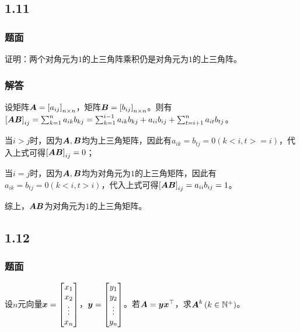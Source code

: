 \documentclass{beamer}
\begin{document}
\subsection*{1.11}

\begin{frame}
\frametitle{题面}

证明：两个对角元为\(1\)的上三角阵乘积仍是对角元为\(1\)的上三角阵。

\end{frame}

\begin{frame}
\frametitle{解答}

    设矩阵\(\boldsymbol{A}=\left[ a_{ij} \right]_{n\times n}\)，矩阵\(\boldsymbol{B}=\left[ b_{ij} \right]_{n\times n}\)。则有\(\left[ \boldsymbol{A}\boldsymbol{B} \right]_{ij}=\sum_{k=1}^na_{ik}b_{kj}=\sum_{k=1}^{i-1}a_{ik}b_{kj}+a_{ii}b_{ij}+\sum_{t=i+1}^na_{it}b_{tj}\)。

    当\(i>j\)时，因为\(\boldsymbol{A},\boldsymbol{B}\)均为上三角矩阵，因此有\(a_{ik}=b_{tj}=0(k<i,t>=i)\)，代入上式可得\(\left[ \boldsymbol{A}\boldsymbol{B} \right]_{ij}=0\)；

    当\(i=j\)时，因为\(\boldsymbol{A},\boldsymbol{B}\)均为对角元为\(1\)的上三角矩阵，因此有\(a_{ik}=b_{tj}=0(k<i,t>i)\)，代入上式可得\(\left[ \boldsymbol{A}\boldsymbol{B} \right]_{ij}=a_{ii}b_{ij}=1\)。

    综上，\(\boldsymbol{A}\boldsymbol{B}\)为对角元为\(1\)的上三角矩阵。

\end{frame}

\subsection*{1.12}

\begin{frame}
    \frametitle{题面}

    设\(n\)元向量\(\boldsymbol{x}=\begin{bmatrix}x_1\\x_2\\\vdots\\x_n\end{bmatrix}\)，\(\boldsymbol{y}=\begin{bmatrix}y_1\\y_2\\\vdots\\y_n\end{bmatrix}\)。若\(\boldsymbol{A}=\boldsymbol{y}\boldsymbol{x}^\top\)，求\(\boldsymbol{A}^k\left( k\in\mathbb{N}^+ \right)\)。

\end{frame}
\end{document}
